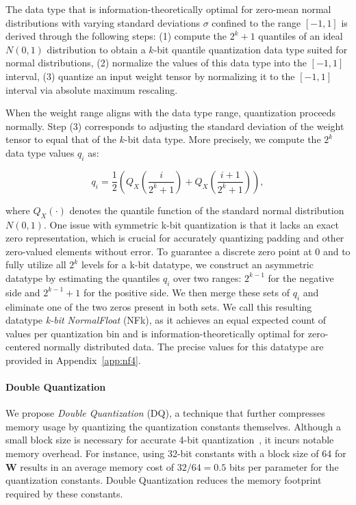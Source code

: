 The data type that is information-theoretically optimal for zero-mean normal distributions with varying standard deviations $\sigma$ confined to the range $[-1, 1]$ is derived through the following steps: (1) compute the $2^k+1$ quantiles of an ideal $N(0, 1)$ distribution to obtain a $k$-bit quantile quantization data type suited for normal distributions, (2) normalize the values of this data type into the $[-1, 1]$ interval, (3) quantize an input weight tensor by normalizing it to the $[-1, 1]$ interval via absolute maximum rescaling.

When the weight range aligns with the data type range, quantization proceeds normally. Step (3) corresponds to adjusting the standard deviation of the weight tensor to equal that of the $k$-bit data type. More precisely, we compute the $2^k$ data type values $q_i$ as:

\begin{equation}
q_i  = \frac{1}{2}\left( Q_X\left(\frac{i}{2^k+1}\right) + Q_X\left(\frac{i+1}{2^k+1}\right)\right),
\end{equation}

where $Q_X(\cdot)$ denotes the quantile function of the standard normal distribution $N(0,1)$. One issue with symmetric k-bit quantization is that it lacks an exact zero representation, which is crucial for accurately quantizing padding and other zero-valued elements without error. To guarantee a discrete zero point at $0$ and to fully utilize all $2^k$ levels for a k-bit datatype, we construct an asymmetric datatype by estimating the quantiles $q_i$ over two ranges: $2^{k-1}$ for the negative side and $2^{k-1}+1$ for the positive side. We then merge these sets of $q_i$ and eliminate one of the two zeros present in both sets. We call this resulting datatype \emph{k-bit NormalFloat} (NFk), as it achieves an equal expected count of values per quantization bin and is information-theoretically optimal for zero-centered normally distributed data. The precise values for this datatype are provided in Appendix~\ref{app:nf4}.

\paragraph{Double Quantization{}} 
We propose \emph{Double Quantization} (DQ), a technique that further compresses memory usage by quantizing the quantization constants themselves. Although a small block size is necessary for accurate 4-bit quantization~\citep{dettmers2022case}, it incurs notable memory overhead. For instance, using 32-bit constants with a block size of 64 for $\mathbf{W}$ results in an average memory cost of $32/64 = 0.5$ bits per parameter for the quantization constants. Double Quantization reduces the memory footprint required by these constants.


